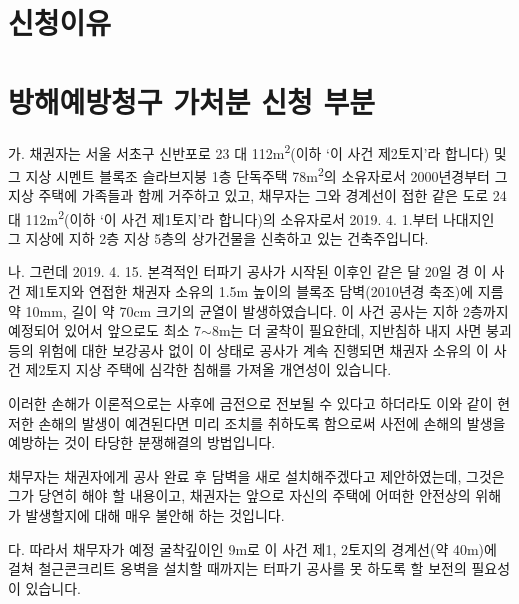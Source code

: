 \documentclass[12pt]{oblivoir}
\def\mysection#1{\hfil #1 \hfil} %
\begin{document}
\section*{\mysection{\large 신청이유}}
\vspace{1em}
\section{방해예방청구 가처분 신청 부분}
가. 채권자는 서울 서초구 신반포로 23 대 112\si{\square\metre}(이하 `이 사건 제2토지'라 합니다) 및 그 지상 시멘트 블록조 슬라브지붕 1층 단독주택 78\si{\square\metre}의 소유자로서 2000년경부터 그 지상 주택에 가족들과 함께 거주하고 있고, 채무자는 그와 경계선이 접한 같은 도로 24 대 112\si{\square\metre}(이하 `이 사건 제1토지'라 합니다)의 소유자로서 2019. 4. 1.부터 나대지인 그 지상에 지하 2층 지상 5층의 상가건물을 신축하고 있는 건축주입니다.\par
나. 그런데 2019. 4. 15. 본격적인 터파기 공사가 시작된 이후인 같은 달 20일 경 이 사건 제1토지와 연접한 채권자 소유의 1.5\si{\metre} 높이의 블록조 담벽(2010년경 축조)에 지름 약 10\si{\milli\metre}, 길이 약 70\si{\centi\metre} 크기의 균열이 발생하였습니다. 이 사건 공사는 지하 2층까지 예정되어 있어서 앞으로도 최소 7$\sim$8\si{\metre}는 더 굴착이 필요한데, 지반침하 내지 사면 붕괴 등의 위험에 대한 보강공사 없이 이 상태로 공사가 계속 진행되면 채권자 소유의 이 사건 제2토지 지상 주택에 심각한 침해를 가져올 개연성이 있습니다.\par
이러한 손해가 이론적으로는 사후에 금전으로 전보될 수 있다고 하더라도 이와 같이 현저한 손해의 발생이 예견된다면 미리 조치를 취하도록 함으로써 사전에 손해의 발생을 예방하는 것이 타당한 분쟁해결의 방법입니다.\par
채무자는 채권자에게 공사 완료 후 담벽을 새로 설치해주겠다고 제안하였는데, 그것은 그가 당연히 해야 할 내용이고, 채권자는 앞으로 자신의 주택에 어떠한 안전상의 위해가 발생할지에 대해 매우 불안해 하는 것입니다.\par
다. 따라서 채무자가 예정 굴착깊이인 9\si{\metre}로 이 사건 제1, 2토지의 경계선(약 40\si{\metre})에 걸쳐 철근콘크리트 옹벽을 설치할 때까지는 터파기 공사를 못 하도록 할 보전의 필요성이 있습니다.
\end{document}
